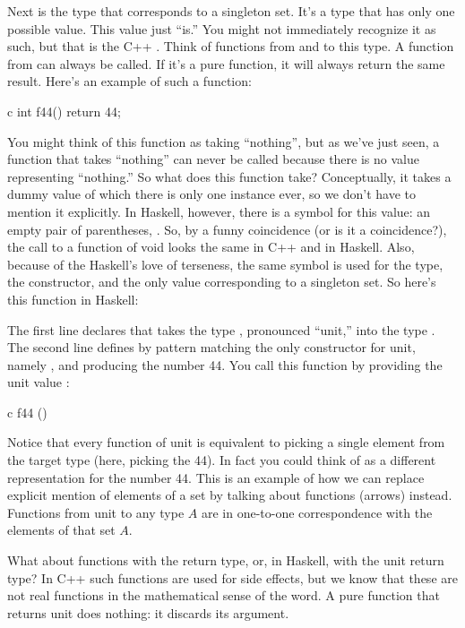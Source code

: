 Next is the type that corresponds to a singleton set. It's a type that
has only one possible value. This value just ``is.'' You might not
immediately recognize it as such, but that is the C++ .
Think of functions from and to this type. A function from 
can always be called. If it's a pure function, it will always return the
same result. Here's an example of such a function:

\begin{snip}{c}
int f44() { return 44; }
\end{snip}
You might think of this function as taking ``nothing'', but as we've
just seen, a function that takes ``nothing'' can never be called because
there is no value representing ``nothing.'' So what does this function
take? Conceptually, it takes a dummy value of which there is only one
instance ever, so we don't have to mention it explicitly. In Haskell,
however, there is a symbol for this value: an empty pair of parentheses,
\code{()}. So, by a funny coincidence (or is it a coincidence?), the
call to a function of void looks the same in C++ and in Haskell. Also,
because of the Haskell's love of terseness, the same symbol \code{()}
is used for the type, the constructor, and the only value corresponding
to a singleton set. So here's this function in Haskell:

The first line declares that  takes the type \code{()},
pronounced ``unit,'' into the type . The second line
defines  by pattern matching the only constructor for unit,
namely \code{()}, and producing the number 44. You call this function
by providing the unit value \code{()}:

\begin{snip}{c}
f44 ()
\end{snip}
Notice that every function of unit is equivalent to picking a single
element from the target type (here, picking the  44). In
fact you could think of  as a different representation for
the number 44. This is an example of how we can replace explicit mention
of elements of a set by talking about functions (arrows) instead.
Functions from unit to any type $A$ are in one-to-one correspondence with
the elements of that set $A$.

What about functions with the  return type, or, in Haskell,
with the unit return type? In C++ such functions are used for side
effects, but we know that these are not real functions in the
mathematical sense of the word. A pure function that returns unit does
nothing: it discards its argument.

